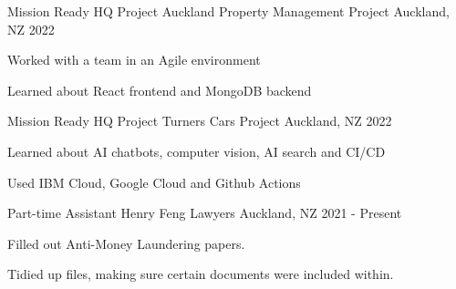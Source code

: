 

\begin{cventries}
\cventry
{Mission Ready HQ Project} %
{Auckland Property Management Project} %
{Auckland, NZ} %
{2022} %
{
  \begin{cvitems} %
    \item {Worked with a team in an Agile environment}
    \item {Learned about React frontend and MongoDB backend}
  \end{cvitems}
}

\cventry
{Mission Ready HQ Project} %
{Turners Cars Project} %
{Auckland, NZ} %
{2022} %
{
  \begin{cvitems} %
    \item {Learned about AI chatbots, computer vision, AI search and CI/CD}
    \item {Used IBM Cloud, Google Cloud and Github Actions}
  \end{cvitems}
}

  \cventry
    {Part-time Assistant} %
    {Henry Feng Lawyers} %
    {Auckland, NZ} %
    {2021 - Present} %
    {
      \begin{cvitems} %
        \item {Filled out Anti-Money Laundering papers.}
        \item {Tidied up files, making sure certain documents were included within.}
      \end{cvitems}
    }


\end{cventries}
